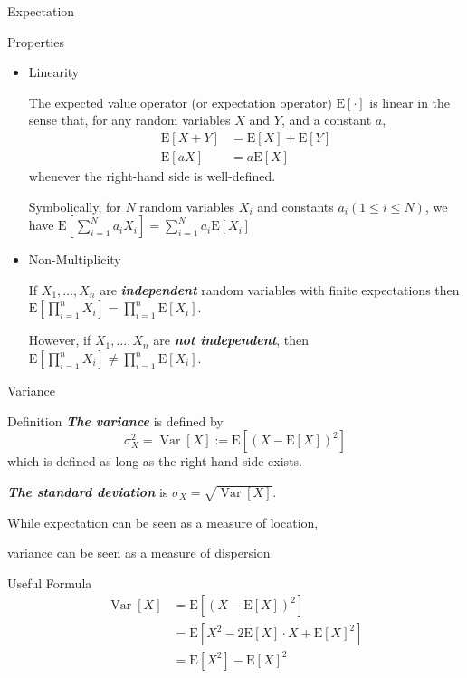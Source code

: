\documentclass{beamer}
\newcommand{\bb}[1]{\textcolor{antiquefuchsia}{\textbf{\textit{#1}}}}
\begin{document}
\begin{frame}{Expectation}
\begin{block}{Properties}
\begin{itemize}
\item Linearity

The expected value operator (or expectation operator) $\mathrm{E}[\cdot]$ is linear in the sense that, for any random variables $X$ and $Y$, and a constant $a$,
$$
\begin{aligned}
\mathrm{E}[X+Y] &=\mathrm{E}[X]+\mathrm{E}[Y] \\
\mathrm{E}[a X] &=a \mathrm{E}[X]
\end{aligned}
$$
whenever the right-hand side is well-defined. 

Symbolically, for $N$ random variables $X_{i}$ and constants $a_{i}(1 \leq i \leq N)$, we have $\mathrm{E}\left[\sum_{i=1}^{N} a_{i} X_{i}\right]=\sum_{i=1}^{N} a_{i} \mathrm{E}\left[X_{i}\right]$

\item Non-Multiplicity

If $X_{1}, \ldots, X_{n}$ are \bb{independent} random variables with finite expectations then
$
\mathrm{E}\left[\prod_{i=1}^{n} X_{i}\right]=\prod_{i=1}^{n} \mathrm{E}\left[X_{i}\right]
$.

However, if $X_{1}, \ldots, X_{n}$ are \bb{not independent}, then $
\mathrm{E}\left[\prod_{i=1}^{n} X_{i}\right]\neq\prod_{i=1}^{n} \mathrm{E}\left[X_{i}\right]
$.
\end{itemize}
\end{block}
\end{frame}

\begin{frame}{Variance}
\begin{block}{Definition}
\bb{The variance} is defined by
$$
\sigma_{X}^{2}=\operatorname{Var}[X]:=\mathrm{E}\left[(X-\mathrm{E}[X])^{2}\right]
$$
which is defined as long as the right-hand side exists. 

\bb{The standard deviation} is $\sigma_{X}=\sqrt{\operatorname{Var}[X]}$.
\end{block}
While expectation can be seen as a measure of location, 

variance can be seen as a measure of dispersion.
\begin{block}{Useful Formula}
$$\begin{aligned}
\operatorname{Var}[X] &=\mathrm{E}\left[(X-\mathrm{E}[X])^{2}\right] \\
&=\mathrm{E}\left[X^{2}-2 \mathrm{E}[X] \cdot X+\mathrm{E}[X]^{2}\right] \\
&=\mathrm{E}\left[X^{2}\right]-\mathrm{E}[X]^{2}
\end{aligned}$$
\end{block}
\end{frame}
\end{document}
